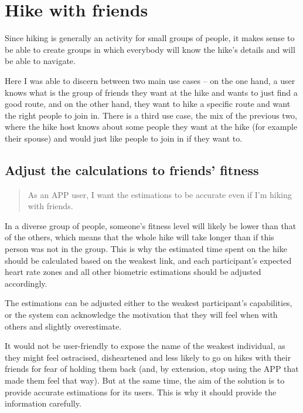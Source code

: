 
\section{Hike with friends}\label{epic:friends}

Since hiking is generally an activity for small groups of people, it makes sense to be able to create groups in which everybody will know the hike's details and will be able to navigate.

Here I was able to discern between two main use cases -- on the one hand, a user knows what is the group of friends they want at the hike and wants to just find a good route,
and on the other hand, they want to hike a specific route and want the right people to join in.
There is a third use case, the mix of the previous two, where the hike host knows about some people they want at the hike (for example their spouse) and would just like people to join in if they want to.

\subsection{Adjust the calculations to friends' fitness}\label{US:friends-fitness}
\begin{quote}
As an APP user, I want the estimations to be accurate even if I'm hiking with friends.
\end{quote}

In a diverse group of people, someone's fitness level will likely be lower than that of the others, which means that the whole hike will take longer than if this person was not in the group.
This is why the estimated time spent on the hike should be calculated based on the weakest link, and each participant's expected heart rate zones and all other biometric estimations should be adjusted accordingly.

The estimations can be adjusted either to the weakest participant's capabilities, or the system can acknowledge the motivation that they will feel when with others and slightly overestimate.

It would not be user-friendly to expose the name of the weakest individual, as they might feel ostracised, disheartened and less likely to go on hikes with their friends for fear of holding them back
(and, by extension, stop using the APP that made them feel that way).
But at the same time, the aim of the solution is to provide accurate estimations for its users.
This is why it should provide the information carefully.

